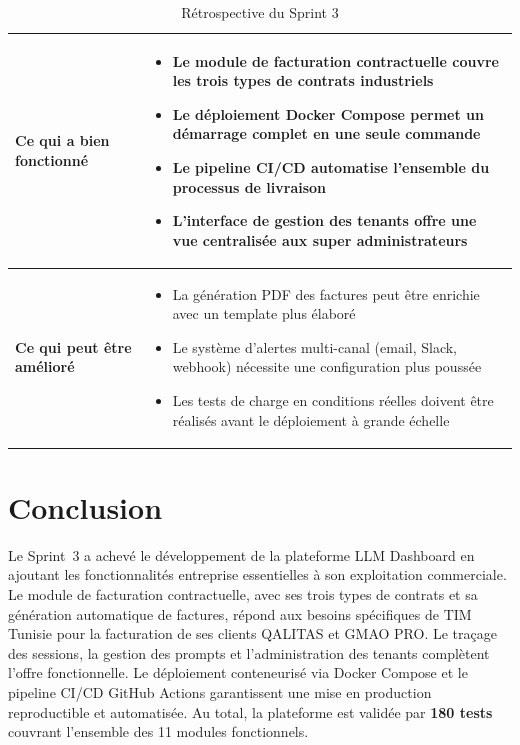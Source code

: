 \begin{table}[H]
\centering
\caption{Rétrospective du Sprint 3}
\label{tab:retro_s3}
\begin{tabularx}{\textwidth}{|l|X|}
\hline
\textbf{Ce qui a bien fonctionné} & \begin{minipage}[t]{\linewidth}\vspace{2pt}
\begin{itemize}[noitemsep,topsep=0pt]
\item Le module de facturation contractuelle couvre les trois types de contrats industriels
\item Le déploiement Docker Compose permet un démarrage complet en une seule commande
\item Le pipeline CI/CD automatise l'ensemble du processus de livraison
\item L'interface de gestion des tenants offre une vue centralisée aux super administrateurs
\end{itemize}\vspace{2pt}
\end{minipage} \\
\hline
\textbf{Ce qui peut être amélioré} & \begin{minipage}[t]{\linewidth}\vspace{2pt}
\begin{itemize}[noitemsep,topsep=0pt]
\item La génération PDF des factures peut être enrichie avec un template plus élaboré
\item Le système d'alertes multi-canal (email, Slack, webhook) nécessite une configuration plus poussée
\item Les tests de charge en conditions réelles doivent être réalisés avant le déploiement à grande échelle
\end{itemize}\vspace{2pt}
\end{minipage} \\
\hline
\end{tabularx}
\end{table}


\section*{Conclusion}

Le Sprint~3 a achevé le développement de la plateforme LLM Dashboard en ajoutant les fonctionnalités entreprise essentielles à son exploitation commerciale. Le module de facturation contractuelle, avec ses trois types de contrats et sa génération automatique de factures, répond aux besoins spécifiques de TIM Tunisie pour la facturation de ses clients QALITAS et GMAO PRO. Le traçage des sessions, la gestion des prompts et l'administration des tenants complètent l'offre fonctionnelle. Le déploiement conteneurisé via Docker Compose et le pipeline CI/CD GitHub Actions garantissent une mise en production reproductible et automatisée. Au total, la plateforme est validée par \textbf{180 tests} couvrant l'ensemble des 11 modules fonctionnels.
